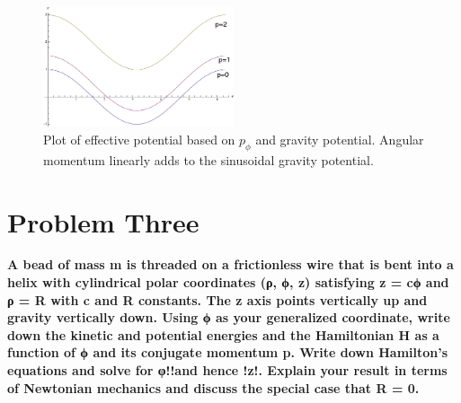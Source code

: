 \documentclass[10pt]{article} %
\begin{document}
\begin{figure}[h]
\caption{Plot of effective potential based on $p_{\phi}$ and gravity potential. Angular momentum linearly adds to the sinusoidal gravity potential.}
\centering
\includegraphics[width=0.5\textwidth]{../v-plot_legend.png}
\end{figure}

\section{Problem Three}
\textbf{A bead of mass m is threaded on a frictionless wire that is bent into a helix with cylindrical polar coordinates (ρ, ϕ, z) satisfying z = cϕ and ρ = R with c and R constants. The z axis points vertically up and gravity vertically down. Using ϕ as your generalized coordinate, write down the kinetic and potential energies and the Hamiltonian H as a function of ϕ and its conjugate momentum p. Write down Hamilton’s equations and solve for φ!!and hence !z!. Explain your result in terms of Newtonian mechanics and discuss the special case that R = 0.}
\end{document}
